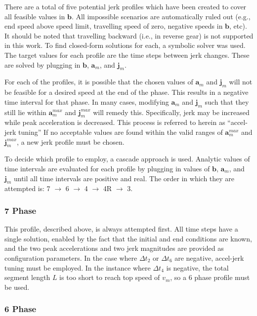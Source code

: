 \documentclass[letterpaper, 10 pt, conference]{ieeeconf}  %
\begin{document}
There are a total of five potential jerk profiles which have been created to cover all feasible values in $\mathbf{b}$.
All impossible scenarios are automatically ruled out (e.g., end speed above speed limit, travelling speed of zero, negative speeds in $\mathbf{b}$, etc).
It should be noted that travelling backward (i.e., in reverse gear) is not supported in this work.
To find closed-form solutions for each, a symbolic solver was used.
The target values for each profile are the time steps between jerk changes.
These are solved by plugging in $\mathbf{b}$, $\mathbf{a}_m$, and $\mathbf{j}_m$.

For each of the profiles, it is possible that the chosen values of $\mathbf{a}_m$ and $\mathbf{j}_m$ will not be feasible for a desired speed at the end of the phase.
This results in a negative time interval for that phase.
In many cases, modifying $\mathbf{a}_m$ and $\mathbf{j}_m$ such that they still lie within $\mathbf{a}^{max}_m$ and $\mathbf{j}^{max}_m$ will remedy this.
Specifically, jerk may be increased while peak acceleration is decreased.
This process is referred to herein as ``accel-jerk tuning''
If no acceptable values are found within the valid ranges of $\mathbf{a}^{max}_m$ and $\mathbf{j}^{max}_m$, a new jerk profile must be chosen.

To decide which profile to employ, a cascade approach is used.
Analytic values of time intervals are evaluated for each profile by plugging in values of $\mathbf{b}$, $\mathbf{a}_m$, and $\mathbf{j}_m$ until all time intervals are positive and real. 
The order in which they are attempted is: 7 $\rightarrow$ 6 $\rightarrow$ 4 $\rightarrow$ 4R $\rightarrow$ 3.

\subsubsection{7 Phase} \label{sec:7phase}

This profile, described above, is always attempted first.
All time steps have a single solution, enabled by the fact that the initial and end conditions are known, and the two peak accelerations and two jerk magnitudes are provided as configuration parameters.
In the case where $\Delta t_2$ or $\Delta t_6$ are negative, accel-jerk tuning must be employed.
In the instance where $\Delta t_4$ is negative, the total segment length $L$ is too short to reach top speed of $v_m$, so a 6 phase profile must be used.

\subsubsection{6 Phase} \label{sec:6phase}
\end{document}
